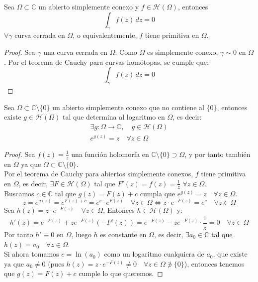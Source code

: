 \begin{teorema}
    Sea $\Omega \subset \mathbb{C}$ un abierto simplemente conexo y $f \in \mathcal{H}(\Omega)$, entonces
    \[
        \int_{\gamma} f(z) \, dz = 0
    \]
    $ \forall \gamma $ curva cerrada en $ \Omega $, o equivalentemente, $f$ tiene primitiva en $\Omega$.
\end{teorema}

\begin{proof}
    Sea $\gamma$ una curva cerrada en $\Omega$. Como $\Omega$ es simplemente conexo, $\gamma \sim 0$ en $\Omega$. Por el teorema de Cauchy para curvas homótopas, se cumple que:
    \[
        \int_{\gamma} f(z) \, dz = 0
    \]
\end{proof}

\begin{corolario}
    Sea $\Omega \subset \mathbb{C} \setminus \{0\}$ un abierto simplemente conexo que no contiene al $\{0\}$, entonces existe $g \in \mathcal{H}(\Omega)$ tal que determina al logaritmo en $\Omega$, es decir:
    \[
        \begin{array}{c}
            \exists g: \Omega \to \mathbb{C}, \quad g \in \mathcal{H}(\Omega) \\
            e^{g(z)} = z \quad \forall z \in \Omega
        \end{array}
    \]
\end{corolario}

\begin{proof}
    Sea $f(z) = \frac{1}{z}$ una función holomorfa en $\mathbb{C} \setminus \{0\} \supset \Omega$, y por tanto también en $\Omega$ ya que $\Omega \subset \mathbb{C} \setminus \{0\}$.\\
    Por el teorema de Cauchy para abiertos simplemente conexos, $f$ tiene primitiva en $\Omega$, es decir, $\exists F \in \mathcal{H}(\Omega)$ tal que $F'(z) = f(z) = \frac{1}{z}$ \quad $\forall z \in \Omega$.\\
    Buscamos $c \in \mathbb{C}$ tal que $g(z) = F(z) + c$ cumpla que $e^{g(z)} = z \quad \forall z \in \Omega$.\\
    \[
    z =
    e^{g(z)} =
    e^{F(z) + c} =
    e^c \cdot e^{F(z)} \quad \forall z \in \Omega \iff
    z \cdot e^{-F(z)} = e^c \quad \forall z \in \Omega
    \]
    Sea $h(z) = z \cdot e^{-F(z)} \quad \forall z \in \Omega$. Entonces $h \in \mathcal{H}(\Omega)$ y:
    \[
    h'(z) =
    e^{-F(z)} + ze^{-F(z)}(-F'(z)) =
    e^{-F(z)} - ze^{-F(z)} \cdot \frac{1}{z} =
    0 \quad \forall z \in \Omega
    \]
    Por tanto $h' \equiv 0$ en $\Omega$, luego $h$ es constante en $\Omega$, es decir, $\exists a_0 \in \mathbb{C}$ tal que $h(z) = a_0 \quad \forall z \in \Omega$.\\
    Si ahora tomamos $c = \ln(a_0)$ como un logaritmo cualquiera de $a_0$, que existe ya que $a_0 \neq 0$ (pues $h(z) = z \cdot e^{-F(z)} \neq 0 \quad \forall z \in \Omega \not\ni \{0\}$), entonces tenemos que $g(z) = F(z) + c$ cumple lo que queremos.
\end{proof}

